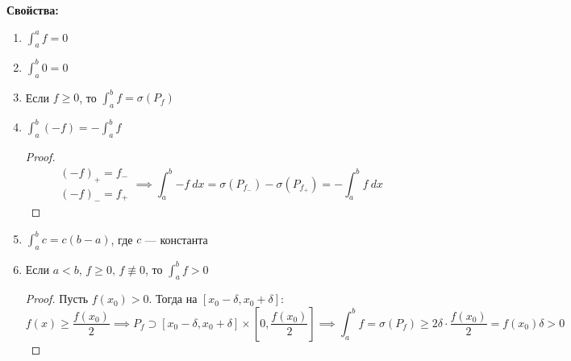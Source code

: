 \textbf{Свойства:}
\begin{enumerate}
\item $\displaystyle \int_{a}^{a} f = 0$
\item $\displaystyle \int_{a}^{b} 0 = 0$
\item Если $f \geq 0$, то $\displaystyle \int_{a}^{b} f = \sigma(P_f)$
\item $\displaystyle \int_{a}^{b}(-f) = -\int_{a}^{b} f$
\begin{proof}
    \begin{equation*}
        \begin{gathered}
            (-f)_{+} = f_{-} \\
            (-f)_{-} = f_{+}
        \end{gathered}
        \implies
        \int_{{a}}^{{b}} {-f} \: d{x} =
        \sigma(P_{f_{-}}) - \sigma(P_{f_{+}}) =
        - \int_{{a}}^{{b}} {f} \: d{x}
    \end{equation*}
\end{proof}
\item $\displaystyle \int_{a}^{b} c = c(b - a)$, где $c$ --- константа
\item Если $a < b,\, f \geq 0, \, f \not \equiv 0$, то $\displaystyle \int_{a}^{b} f > 0$
\begin{proof}
    Пусть $f(x_0) > 0$. Тогда на $[x_0 - \delta, x_0 + \delta]$:
    \begin{equation*}
    f(x) \geq \frac{f(x_0)}{2}
    \implies
    P_f \supset [x_0 - \delta, x_0 + \delta] \times [0, \frac{f(x_0)}{2}] \implies
    \int_{a}^{b} f = \sigma(P_f) \geq 2\delta \cdot \frac{f(x_0)}{2} = f(x_0)\delta > 0
    \end{equation*}
\end{proof}
\end{enumerate}